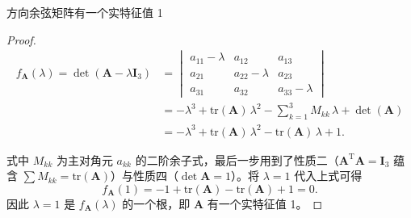 \begin{property}[性质八]\label{prop:dcm-eigenvalue}
	方向余弦矩阵有一个实特征值 1
\end{property}
\begin{proof}
	$$
	 \begin{aligned}
		 f_{\boldsymbol{A}}(\lambda)=\det(\boldsymbol{A}-\lambda\boldsymbol{I}_3)&=\begin{vmatrix}a_{11}-\lambda&a_{12}&a_{13}\\a_{21}&a_{22}-\lambda&a_{23}\\a_{31}&a_{32}&a_{33}-\lambda\end{vmatrix}\\
		 &=-\lambda^3+\mathrm{tr}(\boldsymbol{A})\,\lambda^2-\sum_{k=1}^{3}M_{kk}\,\lambda+\det(\boldsymbol{A})\\
		 &=-\lambda^3+\mathrm{tr}(\boldsymbol{A})\,\lambda^2-\mathrm{tr}(\boldsymbol{A})\,\lambda+1.
		 \end{aligned} $$

 式中 $M_{kk}$ 为主对角元 $a_{kk}$ 的二阶余子式，最后一步用到了性质二（$\boldsymbol{A}^{\mathrm{T}}\boldsymbol{A}=\boldsymbol{I}_3$ 蕴含 $\sum M_{kk}=\mathrm{tr}(\boldsymbol{A})$）与性质四（$\det\boldsymbol{A}=1$）。将 $\lambda=1$ 代入上式可得
 $$
 f_{\boldsymbol{A}}(1)=-1+\mathrm{tr}(\boldsymbol{A})-\mathrm{tr}(\boldsymbol{A})+1=0.
 $$ 因此 $\lambda=1$ 是 $f_{\boldsymbol{A}}(\lambda)$ 的一个根，即 $\boldsymbol{A}$ 有一个实特征值 1。
	
\end{proof}